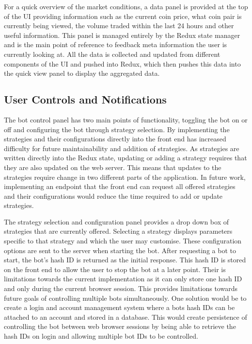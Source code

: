 For a quick overview of the market conditions, a data panel is provided at the top of the UI providing information such as the current coin price, what coin pair is currently being viewed, the volume traded within the last 24 hours and other useful information. This panel is managed entirely by the Redux state manager and is the main point of reference to feedback meta information the user is currently looking at. All the data is collected and updated from different components of the UI and pushed into Redux, which then pushes this data into the quick view panel to display the aggregated data.

\subsection{User Controls and Notifications}
\label{sec:implementation:frontend:controls_notifications}
\noindent The bot control panel has two main points of functionality, toggling the bot on or off and configuring the bot through strategy selection. By implementing the strategies and their configurations directly into the front end has increased difficulty for future maintainability and addition of strategies. As strategies are written directly into the Redux state, updating or adding a strategy requires that they are also updated on the web server. This means that updates to the strategies require change in two different parts of the application. In future work, implementing an endpoint that the front end can request all offered strategies and their configurations would reduce the time required to add or update strategies.

The strategy selection and configuration panel provides a drop down box of strategies that are currently offered. Selecting a strategy displays parameters specific to that strategy and which the user may customise. These configuration options are sent to the server when starting the bot. After requesting a bot to start, the bot's hash ID is returned as the initial response. This hash ID is stored on the front end to allow the user to stop the bot at a later point. Their is limitations towards the current implementation as it can only store one hash ID and only during the current browser session. This provides limitations towards future goals of controlling multiple bots simultaneously. One solution would be to create a login and account management system where a bots hash IDs can be attached to an account and stored in a database. This would create persistence of controlling the bot between web browser sessions by being able to retrieve the hash IDs on login and allowing multiple bot IDs to be controlled. 

